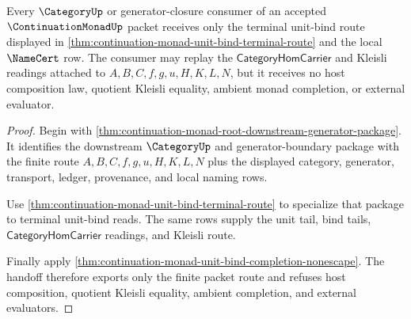 \begin{theorem}
\label{thm:continuation-monad-unit-bind-kleisli-consumer-handoff}
Every $\CategoryUp$ or generator-closure consumer of an accepted $\ContinuationMonadUp$ packet receives only the terminal unit-bind route displayed in \autoref{thm:continuation-monad-unit-bind-terminal-route} and the local $\NameCert$ row. The consumer may replay the $\mathsf{CategoryHomCarrier}$ and Kleisli readings attached to $A,B,C,f,g,u,H,K,L,N$, but it receives no host composition law, quotient Kleisli equality, ambient monad completion, or external evaluator.
\end{theorem}
\begin{proof}
Begin with \autoref{thm:continuation-monad-root-downstream-generator-package}. It identifies the downstream $\CategoryUp$ and generator-boundary package with the finite route $A,B,C,f,g,u,H,K,L,N$ plus the displayed category, generator, transport, ledger, provenance, and local naming rows.

Use \autoref{thm:continuation-monad-unit-bind-terminal-route} to specialize that package to terminal unit-bind reads. The same rows supply the unit tail, bind tails, $\mathsf{CategoryHomCarrier}$ readings, and Kleisli route.

Finally apply \autoref{thm:continuation-monad-unit-bind-completion-nonescape}. The handoff therefore exports only the finite packet route and refuses host composition, quotient Kleisli equality, ambient completion, and external evaluators.
\end{proof}

